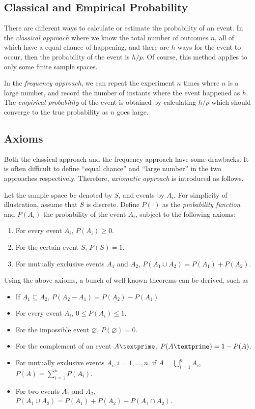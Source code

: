 \subsection{Classical and Empirical Probability}

There are different ways to calculate or estimate the probability of an event. In the \textit{classical approach} where we know the total number of outcomes $n$, all of which have a equal chance of happening, and there are $h$ ways for the event to occur, then the probability of the event is $h/p$. Of course, this method applies to only some finite sample spaces.

In the \textit{frequency approach}, we can repeat the experiment $n$ times where $n$ is a large number, and record the number of instants where the event happened as $h$. The \textit{empirical probability} of the event is obtained by calculating $h/p$ which should converge to the true probability as $n$ goes large.

\subsection{Axioms}


Both the classical approach and the frequency approach have some drawbacks. It is often difficult to define ``equal chance'' and ``large number'' in the two approaches respectively. Therefore, \textit{axiomatic approach} is introduced as follows.

Let the sample space be denoted by $S$, and events by $A_i$. For simplicity of illustration, assume that $S$ is discrete. Define $P(\cdot)$ as the \textit{probability function} and $P(A_i)$ the probability of the event $A_i$, subject to the following axioms:
\begin{enumerate}
  \item For every event $A_i$, $P(A_i)\geq 0$.
  \item For the certain event $S$, $P(S)=1$.
  \item For mutually exclusive events $A_1$ and $A_2$, $P\left(A_1\cup A_2\right) = P(A_1)+P(A_2)$.
\end{enumerate}

Using the above axioms, a bunch of well-known theorems can be derived, such as
\begin{itemize}
  \item If $A_1 \subseteq A_2$, $P(A_2-A_1) = P(A_2)-P(A_1)$.
  \item For every event $A_i$, $0\leq P(A_i) \leq 1$.
  \item For the impossible event $\varnothing$, $P(\varnothing)=0$.
  \item For the complement of an event $A\textprime$, $P(A\textprime)=1-P(A)$.
  \item For mutually exclusive events $A_i, i=1,...,n$, if $A = \bigcup_{i=1}^{n} A_i$, $P(A) = \sum_{i=1}^{n}P(A_i)$.
  \item For two events $A_1$ and $A_2$, $P\left(A_1\cup A_2\right) = P(A_1)+P(A_2)-P\left(A_1\cap A_2\right)$.
\end{itemize}

